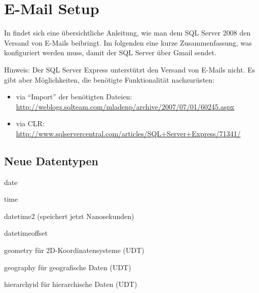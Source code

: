 \documentclass[12pt,ngerman,a4paper,index=totoc,twoside]{scrartcl}
\begin{document}
\section{E-Mail Setup}

In \cite{email:setup} findet sich eine übersichtliche Anleitung, wie man dem SQL Server 2008 den Versand von E-Mails beibringt. Im folgenden eine kurze Zusammenfassung, was konfiguriert werden muss, damit der SQL Server über Gmail sendet.

Hinweis: Der SQL Server Express unterstützt den Versand von E-Mails nicht. Es gibt aber Möglichkeiten, die benötigte Funktionalität nachzurüsten:

\begin{itemize}
	\item via \enquote{Import} der benötigten Dateien: \url{http://weblogs.sqlteam.com/mladenp/archive/2007/07/01/60245.aspx}
	\item via CLR: \url{http://www.sqlservercentral.com/articles/SQL+Server+Express/71341/}
\end{itemize}

\subsection{Neue Datentypen}

\begin{compactitem}
 \item date
 \item time
 \item datetime2 (speichert jetzt Nanosekunden)
 \item datetimeoffset
 \item geometry für 2D-Koordinatensysteme (UDT)
 \item geography für geografische Daten (UDT)
 \item hierarchyid für hierarchische Daten (UDT)
\end{compactitem}

\printindex

\nocite{*}

\printbibliography[title={Artikel},type=article]

\printbibliography[title={Bücher},type=book]

\printbibliography[title={Online-Artikel},type=online]
\end{document}
